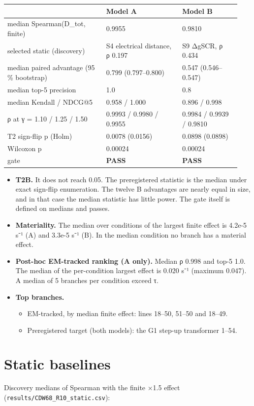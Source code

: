 \documentclass[10pt,a4paper]{article}
\begin{document}
{\small
\begin{longtable}{L{0.396\linewidth}L{0.307\linewidth}L{0.237\linewidth}}
\toprule
\textbf{} & \textbf{Model A} & \textbf{Model B} \\
\midrule
\endhead
median Spearman(D\_tot, finite) & 0.9955 & 0.9810 \\
selected static (discovery) & S4 electrical distance, ρ 0.197 & S9 ΔgSCR, ρ 0.434 \\
median paired advantage (95 \% bootstrap) & 0.799 (0.797–0.800) & 0.547 (0.546–0.547) \\
median top-5 precision & 1.0 & 0.8 \\
median Kendall / NDCG@5 & 0.958 / 1.000 & 0.896 / 0.998 \\
ρ at γ = 1.10 / 1.25 / 1.50 & 0.9993 / 0.9980 / 0.9955 & 0.9984 / 0.9939 / 0.9810 \\
T2 sign-flip p (Holm) & 0.0078 (0.0156) & 0.0898 (0.0898) \\
Wilcoxon p & 0.00024 & 0.00024 \\
gate & \textbf{PASS} & \textbf{PASS} \\
\bottomrule
\end{longtable}}
\begin{itemize}
\item \textbf{T2B.} It does not reach 0.05. The preregistered statistic is the median under exact sign-flip enumeration. The twelve B advantages are nearly equal in size, and in that case the median statistic has little power. The gate itself is defined on medians and passes.
\item \textbf{Materiality.} The median over conditions of the largest finite effect is 4.2e-5 s⁻¹ (A) and 3.3e-5 s⁻¹ (B). In the median condition no branch has a material effect.
\item \textbf{Post-hoc EM-tracked ranking (A only).} Median ρ 0.998 and top-5 1.0. The median of the per-condition largest effect is 0.020 s⁻¹ (maximum 0.047). A median of 5 branches per condition exceed τ.
\item \textbf{Top branches.}
\begin{itemize}
\item EM-tracked, by median finite effect: lines 18–50, 51–50 and 18–49.
\item Preregistered target (both models): the G1 step-up transformer 1–54.
\end{itemize}
\end{itemize}
\section{Static baselines}
Discovery medians of Spearman with the finite ×1.5 effect (\texttt{results/\allowbreak{}CDW68\_\allowbreak{}R10\_\allowbreak{}static.csv}):
\end{document}
